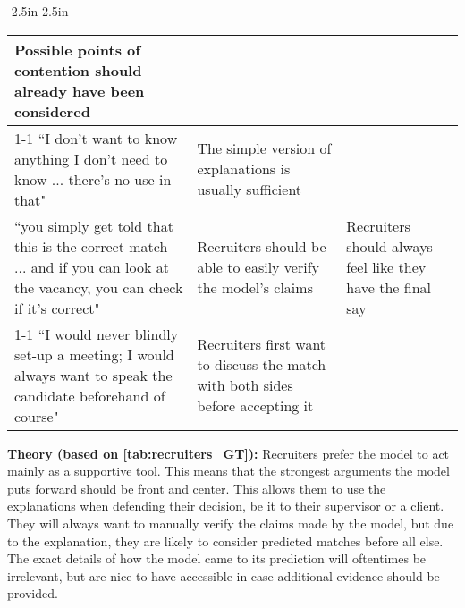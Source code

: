 \begin{table*}[]
\begin{adjustwidth}{-2.5in}{-2.5in}
\begin{tabularx}{1.5\textwidth}{@{}X>{\raggedright\arraybackslash}p{6.5cm}>{\raggedright\arraybackslash}p{3.5cm}@{}}
  Possible points of contention should already have been considered &
   \\ \cmidrule(r){1-1}
``I don't want to know anything I don't need to know ... there's no use in that" &
  The simple version of explanations is usually sufficient &
   \\ \midrule
``you simply get told that this is the correct match ... and if you can look at the vacancy, you can check if it's correct" &
  Recruiters should be able to easily verify the model's claims &
  Recruiters should always feel like they have the final say \\ \cmidrule(r){1-1}
``I would never blindly set-up a meeting; I would always want to speak the candidate beforehand of course" &
  Recruiters first want to discuss the match with both sides before accepting it &
   \\ \bottomrule
   
\end{tabularx}
\end{adjustwidth}
\caption{The quotes, open codes, and categories discovered by using grounded theory for the recruiters' responses.}
\label{tab:recruiters_GT}   
\end{table*}


\noindent \textbf{Theory (based on \cref{tab:recruiters_GT}):} Recruiters prefer the model to act mainly as a supportive tool. This means that the strongest arguments the model puts forward should be front and center. This allows them to use the explanations when defending their decision, be it to their supervisor or a client. They will always want to manually verify the claims made by the model, but due to the explanation, they are likely to consider predicted matches before all else. The exact details of how the model came to its prediction will oftentimes be irrelevant, but are nice to have accessible in case additional evidence should be provided. 

\newpage

